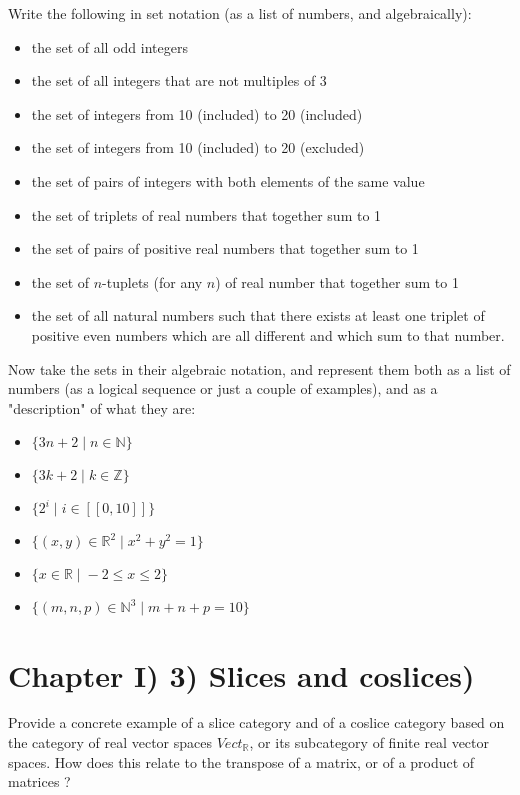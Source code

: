 \documentclass[12pt, letterpaper, twoside]{report}
\begin{document}
Write the following in set notation (as a list of numbers, and algebraically):
\begin{itemize}
	\item the set of all odd integers
	\item the set of all integers that are not multiples of 3
	\item the set of integers from 10 (included) to 20 (included)
	\item the set of integers from 10 (included) to 20 (excluded)
	\item the set of pairs of integers with both elements of the same value
	\item the set of triplets of real numbers that together sum to 1
	\item the set of pairs of positive real numbers that together sum to 1
	\item the set of $n$-tuplets (for any $n$) of real number that together sum to 1
	\item the set of all natural numbers such that there exists at least one triplet of positive even numbers which are all different and which sum to that number.
\end{itemize}

Now take the sets in their algebraic notation, and represent them both as a list of numbers (as a logical sequence or just a couple of examples), and as a "description" of what they are:

\begin{itemize}
	\item $\{3n + 2 \; | \; n \in \mathbb{N} \}$
	\item $\{3k + 2 \; | \; k \in \mathbb{Z} \}$
	\item $\{ 2^i \; | \; i \in [[0, 10]] \}$
	\item $\{ (x, y) \in \mathbb{R}^2 \; | \; x^2 + y^2 = 1 \}$
	\item $\{ x \in \mathbb{R} \; | \; -2 \leq x \leq 2 \}$
	\item $\{ (m, n, p) \in \mathbb{N}^3 \; | \; m + n + p = 10 \}$
\end{itemize}



\section*{Chapter I) 3) Slices and coslices)}

Provide a concrete example of a slice category and of a coslice category based on the category of real vector spaces $Vect_{\mathbb{R}}$, or its subcategory of finite real vector spaces.
How does this relate to the transpose of a matrix, or of a product of matrices ?

\newpage
\end{document}

